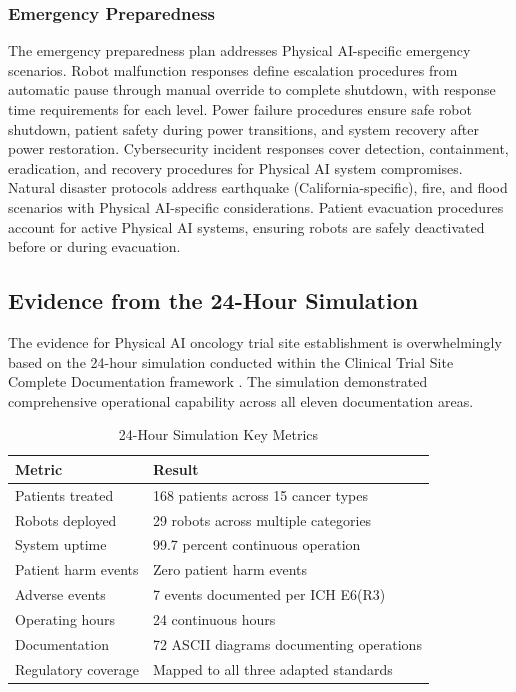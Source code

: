 \subsubsection{Emergency Preparedness}

The emergency preparedness plan addresses Physical AI-specific emergency
scenarios. Robot malfunction responses define escalation procedures from
automatic pause through manual override to complete shutdown, with response
time requirements for each level. Power failure procedures ensure safe robot
shutdown, patient safety during power transitions, and system recovery after
power restoration. Cybersecurity incident responses cover detection,
containment, eradication, and recovery procedures for Physical AI system
compromises. Natural disaster protocols address earthquake (California-specific),
fire, and flood scenarios with Physical AI-specific considerations. Patient
evacuation procedures account for active Physical AI systems, ensuring robots
are safely deactivated before or during evacuation.

\subsection{Evidence from the 24-Hour Simulation}
\label{subsec:site-simulation}

The evidence for Physical AI oncology trial site establishment is
overwhelmingly based on the 24-hour simulation conducted within the Clinical
Trial Site Complete Documentation framework \cite{site-docs}. The simulation
demonstrated comprehensive operational capability across all eleven
documentation areas.

\begin{table}[H]
\centering
\caption{24-Hour Simulation Key Metrics}
\label{tab:simulation-metrics}
\small
\begin{tabularx}{\textwidth}{l X}
\toprule
\textbf{Metric} & \textbf{Result} \\
\midrule
Patients treated & 168 patients across 15 cancer types \\
Robots deployed & 29 robots across multiple categories \\
System uptime & 99.7 percent continuous operation \\
Patient harm events & Zero patient harm events \\
Adverse events & 7 events documented per ICH E6(R3) \\
Operating hours & 24 continuous hours \\
Documentation & 72 ASCII diagrams documenting operations \\
Regulatory coverage & Mapped to all three adapted standards \\
\bottomrule
\end{tabularx}
\end{table}

